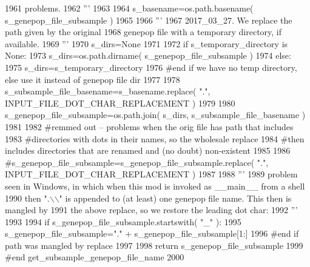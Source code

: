 \begin{DoxyCode}
1961 \textcolor{stringliteral}{    problems.}
1962 \textcolor{stringliteral}{    '''}
1963 
1964     s\_basename=os.path.basename( s\_genepop\_file\_subsample )
1965 
1966     \textcolor{stringliteral}{'''}
1967 \textcolor{stringliteral}{    2017\_03\_27.  We replace the path given by the original}
1968 \textcolor{stringliteral}{    genepop file with a temporary directory, if available.}
1969 \textcolor{stringliteral}{    '''}
1970     s\_dirs=\textcolor{keywordtype}{None}
1971 
1972     \textcolor{keywordflow}{if} s\_temporary\_directory \textcolor{keywordflow}{is} \textcolor{keywordtype}{None}:
1973         s\_dirs=os.path.dirname( s\_genepop\_file\_subsample )
1974     \textcolor{keywordflow}{else}:
1975         s\_dirs=s\_temporary\_directory
1976     \textcolor{comment}{#end if we have no temp directory, else use it instead of genepop file dir}
1977 
1978     s\_subsample\_file\_basename=s\_basename.replace( \textcolor{stringliteral}{"."}, INPUT\_FILE\_DOT\_CHAR\_REPLACEMENT )
1979 
1980     s\_genepop\_file\_subsample=os.path.join( s\_dirs, s\_subsample\_file\_basename )
1981     
1982     \textcolor{comment}{#remmed out -- problems when the orig file has path that includes }
1983     \textcolor{comment}{#directories with dots in their names, so the wholesale replace}
1984     \textcolor{comment}{#then includes directories that are renamed and (no doubt) non-existent}
1985 
1986     \textcolor{comment}{#s\_genepop\_file\_subsample=s\_genepop\_file\_subsample.replace( ".", INPUT\_FILE\_DOT\_CHAR\_REPLACEMENT )}
1987     
1988     \textcolor{stringliteral}{'''}
1989 \textcolor{stringliteral}{    problem seen in Windows, in which when this mod is invoked as \_\_main\_\_ from a shell}
1990 \textcolor{stringliteral}{    then ".\(\backslash\)\(\backslash\)" is appended to (at least) one genepop file name.  This then is mangled by}
1991 \textcolor{stringliteral}{    the above replace, so we restore the leading dot char:}
1992 \textcolor{stringliteral}{    '''}
1993 
1994     \textcolor{keywordflow}{if} s\_genepop\_file\_subsample.startswith(  \textcolor{stringliteral}{"\_"} ):
1995         s\_genepop\_file\_subsample=\textcolor{stringliteral}{"."} + s\_genepop\_file\_subsample[1:] 
1996     \textcolor{comment}{#end if path was mangled by replace}
1997 
1998     \textcolor{keywordflow}{return} s\_genepop\_file\_subsample
1999 \textcolor{comment}{#end get\_subsample\_genepop\_file\_name}
2000 
\end{DoxyCode}
